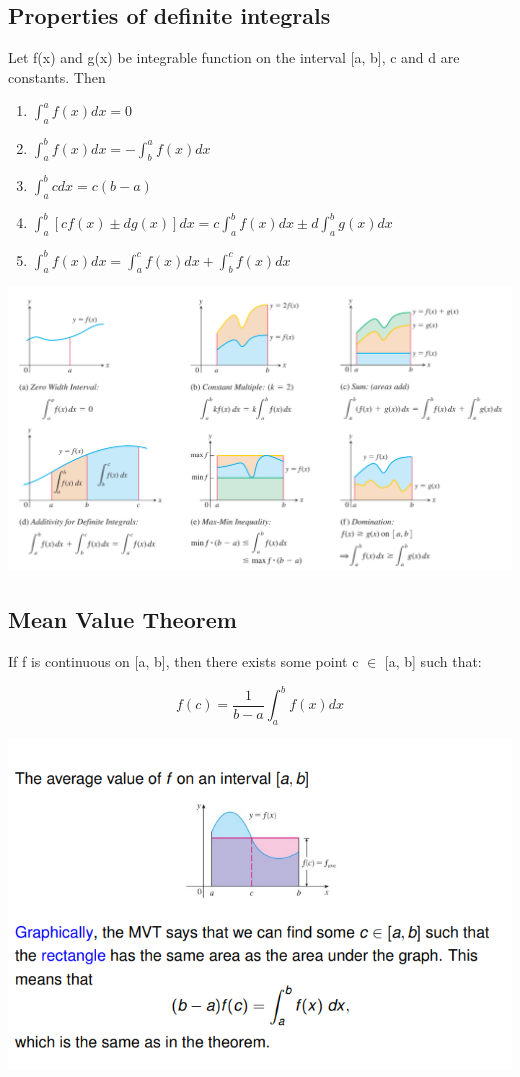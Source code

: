 \documentclass{article}
\begin{document}
\subsection{Properties of definite integrals}
Let f(x) and g(x) be integrable function on the interval [a, b], c and d are constants. Then
\begin{enumerate}
  \item $\int_{a}^{a} f(x) dx = 0 $
  \item $\int_{a}^{b} f(x) dx = -\int_{b}^{a} f(x) dx $
  \item $\int_{a}^{b} c dx = c(b-a) $
  \item $\int_{a}^{b} [cf(x) \pm dg(x)] dx = c\int_{a}^{b}f(x)dx \pm d\int_{a}^{b}g(x)dx $
  \item $\int_{a}^{b} f(x) dx = \int_{a}^{c} f(x) dx + \int_{b}^{c} f(x) dx $
\end{enumerate}

\begin{center}
    \includegraphics[scale = 0.7]{properties.png}
\end{center}

\subsection{Mean Value Theorem}
If f is continuous on [a, b], then there exists some point c $\in$ [a, b] such that:

$$ f(c) = \frac{1}{b-a} \int_{a}^{b}f(x)dx$$

\begin{center}
    \includegraphics[scale=1]{mvt.png}
\end{center}
\end{document}
